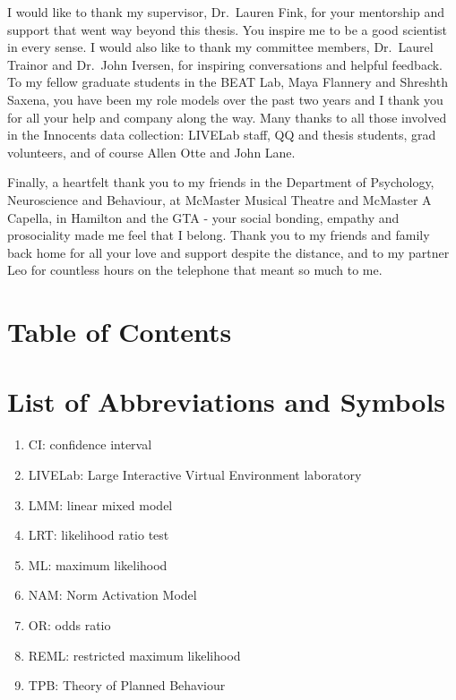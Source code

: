 \documentclass[
  man,floatsintext]{apa6}
\providecommand{\tightlist}{%
  \setlength{\itemsep}{0pt}\setlength{\parskip}{0pt}}
\begin{document}
I would like to thank my supervisor, Dr.~Lauren Fink, for your mentorship and support that went way beyond this thesis. You inspire me to be a good scientist in every sense. I would also like to thank my committee members, Dr.~Laurel Trainor and Dr.~John Iversen, for inspiring conversations and helpful feedback. To my fellow graduate students in the BEAT Lab, Maya Flannery and Shreshth Saxena, you have been my role models over the past two years and I thank you for all your help and company along the way. Many thanks to all those involved in the Innocents data collection: LIVELab staff, QQ and thesis students, grad volunteers, and of course Allen Otte and John Lane.

Finally, a heartfelt thank you to my friends in the Department of Psychology, Neuroscience and Behaviour, at McMaster Musical Theatre and McMaster A Capella, in Hamilton and the GTA - your social bonding, empathy and prosociality made me feel that I belong. Thank you to my friends and family back home for all your love and support despite the distance, and to my partner Leo for countless hours on the telephone that meant so much to me.

\newpage

\section*{Table of Contents}\label{table-of-contents}

\tableofcontents

\newpage

\listoffigures

\newpage

\listoftables

\newpage

\section*{List of Abbreviations and Symbols}\label{list-of-abbreviations-and-symbols}

\begin{enumerate}
\def\labelenumi{\arabic{enumi}.}
\tightlist
\item
  CI: confidence interval
\item
  LIVELab: Large Interactive Virtual Environment laboratory
\item
  LMM: linear mixed model
\item
  LRT: likelihood ratio test
\item
  ML: maximum likelihood
\item
  NAM: Norm Activation Model
\item
  OR: odds ratio
\item
  REML: restricted maximum likelihood
\item
  TPB: Theory of Planned Behaviour
\end{enumerate}
\end{document}
